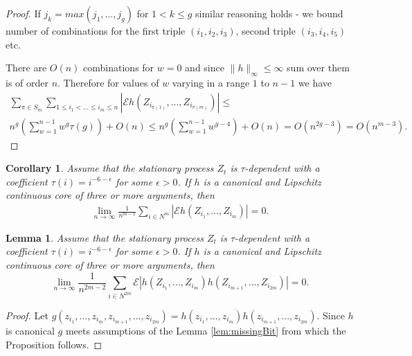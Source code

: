\documentclass{article} %
\newtheorem{lemma}{Lemma}
\newtheorem{corollary}{Corollary}
\newcommand{\ev}{\mathcal{E}}
\begin{document}
\begin{proof}
If $j_k=max(j_1,...,j_g)$ for $1 < k \leq g$ similar reasoning holds - we bound number of combinations for the first triple $(i_1,i_2,i_3)$, second triple $(i_3,i_4,i_5)$ etc. 

There are $O(n)$ combinations for $w=0$ and since $\parallel h \parallel_{\infty} \leq \infty$ sum over them is of order $n$. Therefore for values of $w$ varying in a range $1$ to $n-1$ we have 
\begin{align}
 \sum_{\pi \in S_m} \sum_{1 \leq i_1< ...\leq i_m \leq n} |\ev   h(Z_{i_{\pi(1)}},...,Z_{i_{\pi(m)}})|  \leq \\
n^g \left( \sum_{w=1}^{n-1} w^g \tau(g) \right) + O(n)  \leq  n^g \left( \sum_{w=1}^{n-1} w^{g-4} \right)+O(n) = O( n^{2g-3}) = O( n^{m-3}).
\end{align}
\end{proof}


\begin{corollary}
\label{lem:auxAsymp1}
Assume that the stationary process $Z_t$ is $\tau$-dependent with a coefficient $\tau(i) = i^{-6-\epsilon}$ for some $\epsilon>0$. If $h$ is a canonical and Lipschitz continuous core of three or more arguments, then 
\begin{align}
 \lim_{n \to \infty} \frac{1}{n^{m-1}} \sum_{i \in N^{m}} |\ev   h(Z_{i_1},...,Z_{i_m})| =0.
\end{align}
\end{corollary}




\begin{lemma}
\label{lem:auxAsymp2}
Assume that the stationary process $Z_t$ is $\tau$-dependent with a coefficient $\tau(i) = i^{-6-\epsilon}$ for some $\epsilon>0$. If $h$ is a canonical and Lipschitz continuous core of three or more arguments, then
\[
  \lim_{n \to \infty}\frac{1} {n^{2m-2}}   \sum_{i \in N^{2m}} \ev |h(Z_{i_1},...,Z_{i_m})h(Z_{i_{m+1}},...,Z_{i_{2m}})| = 0.
\]
\end{lemma}
\begin{proof}
Let $g(z_{i_1},...,z_{i_m},z_{i_{m+1}},...,z_{i_{2m}})=h(z_{i_1},...,z_{i_m})h(z_{i_{m+1}},...,z_{i_{2m}})$. Since $h$ is canonical $g$ meets assumptions of the Lemma \ref{lem:missingBit} from which the Proposition follows.
\end{proof}
\end{document}
